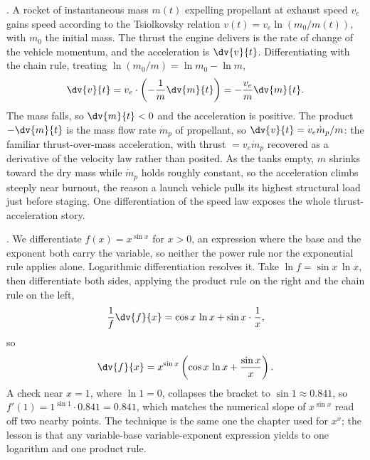 . A rocket of
instantaneous mass $m(t)$ expelling propellant at exhaust speed $v_{e}$
gains speed according to the Tsiolkovsky relation
$v(t) = v_{e}\ln(m_{0}/m(t))$, with $m_{0}$ the initial mass. The
thrust the engine delivers is the rate of change of the vehicle
momentum, and the acceleration is $\dv{v}{t}$. Differentiating with the
chain rule, treating $\ln(m_{0}/m) = \ln m_{0} - \ln m$,
\[
\dv{v}{t} = v_{e}\cdot\left(-\frac{1}{m}\dv{m}{t}\right) =
-\frac{v_{e}}{m}\dv{m}{t}.
\]
The mass falls, so $\dv{m}{t} < 0$ and the acceleration is positive.
The product $-\dv{m}{t}$ is the mass flow rate $\dot{m}_{p}$ of
propellant, so $\dv{v}{t} = v_{e}\dot{m}_{p}/m$: the familiar
thrust-over-mass acceleration, with thrust $= v_{e}\dot{m}_{p}$
recovered as a derivative of the velocity law rather than posited. As
the tanks empty, $m$ shrinks toward the dry mass while $\dot{m}_{p}$
holds roughly constant, so the acceleration climbs steeply near
burnout, the reason a launch vehicle pulls its highest structural load
just before staging. One differentiation of the speed law exposes the
whole thrust-acceleration story.

. We differentiate
$f(x) = x^{\sin x}$ for $x > 0$, an expression where the base and the
exponent both carry the variable, so neither the power rule nor the
exponential rule applies alone. Logarithmic differentiation resolves
it. Take $\ln f = \sin x\,\ln x$, then differentiate both sides,
applying the product rule on the right and the chain rule on the left,
\[
\frac{1}{f}\dv{f}{x} = \cos x\,\ln x + \sin x\cdot\frac{1}{x},
\]
so
\[
\dv{f}{x} = x^{\sin x}\left(\cos x\,\ln x + \frac{\sin x}{x}\right).
\]
A check near $x = 1$, where $\ln 1 = 0$, collapses the bracket to
$\sin 1 \approx 0.841$, so $f'(1) = 1^{\sin 1}\cdot 0.841 = 0.841$,
which matches the numerical slope of $x^{\sin x}$ read off two nearby
points. The technique is the same one the chapter used for $x^{x}$; the
lesson is that any variable-base variable-exponent expression yields to
one logarithm and one product rule.

